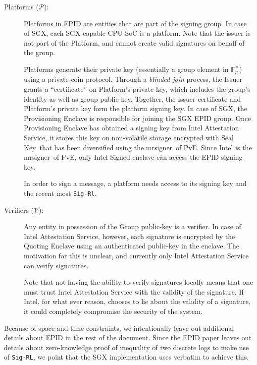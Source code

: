 \documentclass[letterpaper]{article}
\newcommand{\mrsigner}{\textsf{mrsigner}}
\newcommand{\pve}{\textsf{PvE}}
\newcommand{\sk}{\textsf{Seal Key}}
\begin{document}
\begin{description}
    \item[Platforms ($\mathcal{P}$):] Platforms in EPID are entities
      that are part of the signing group. In case of SGX, each SGX
      capable CPU SoC is a platform. Note that the issuer is not part
      of the Platform, and cannot create valid signatures on behalf of
      the group.

      Platforms generate their private key (essentially a group
      element in $\mathbb{F}_p^{\times}$) using a private-coin
      protocol. Through a \textit{blinded join} process, the Issuer
      grants a ``certificate'' on Platform's private key, which
      includes the group's identity as well as group
      public-key. Together, the Issuer certificate and Platform's
      private key form the platform signing key. In case of SGX, the
      \textsf{Provisioning Enclave} is responsible for joining the SGX
      EPID group. Once \textsf{Provisioning Enclave} has obtained a
      signing key from Intel Attestation Service, it stores this key
      on non-volatile storage encrypted with \sk\ that has been
      diversified using the \mrsigner\ of \pve. Since Intel is the
      \mrsigner\ of \pve, only Intel Signed enclave can access the
      EPID signing key.

      In order to sign a message, a platform needs access to its
      signing key and the recent most \texttt{Sig-Rl}.

    \item [Verifiers ($\mathcal{V}$):] Any entity in possession of the
      Group public-key is a verifier. In case of Intel Attestation
      Service, however, each signature is encrypted by the
      \textsf{Quoting Enclave} using an authenticated public-key in
      the enclave. The motivation for this is unclear, and currently
      only Intel Attestation Service can verify signatures.

      Note that not having the ability to verify signatures locally
      means that one must trust Intel Attestation Service with the
      validity of the signature. If Intel, for what ever reason,
      chooses to lie about the validity of a signature, it could
      completely compromise the security of the system.
  \end{description}

  Because of space and time constraints, we intentionally leave out
  additional details about EPID in the rest of the document. Since the
  EPID paper leaves out details about zero-knowledge proof of
  inequality of two discrete logs to make use of \texttt{Sig-RL}, we
  point that the SGX implementation uses \cite[\S6]{ShoupVFE} verbatim
  to achieve this.
\end{document}
